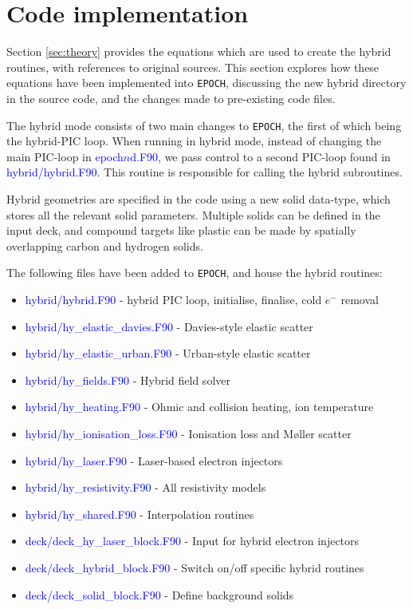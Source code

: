 \documentclass[12pt]{article}
\numberwithin{equation}{section}
\begin{document}
\pagebreak

\section{Code implementation} \label{sec:code}

Section \ref{sec:theory} provides the equations which are used to create the hybrid routines, with references to original sources. This section explores how these equations have been implemented into \texttt{EPOCH}, discussing the new hybrid directory in the source code, and the changes made to pre-existing code files.

The hybrid mode consists of two main changes to \texttt{EPOCH}, the first of which being the hybrid-PIC loop. When running in hybrid mode, instead of changing the main PIC-loop in \textcolor{blue}{epoch$n$d.F90}, we pass control to a second PIC-loop found in \textcolor{blue}{hybrid/hybrid.F90}. This routine is responsible for calling the hybrid subroutines.

Hybrid geometries are specified in the code using a new solid data-type, which stores all the relevant solid parameters. Multiple solids can be defined in the input deck, and compound targets like plastic can be made by spatially overlapping carbon and hydrogen solids.

The following files have been added to \texttt{EPOCH}, and house the hybrid routines:

\begin{itemize}
\item\large{\textcolor{blue}{hybrid/hybrid.F90}} - hybrid PIC loop, initialise, finalise, cold $e^-$ removal
\item\large{\textcolor{blue}{hybrid/hy\_elastic\_davies.F90}} - Davies-style elastic scatter
\item\large{\textcolor{blue}{hybrid/hy\_elastic\_urban.F90}} - Urban-style elastic scatter
\item\large{\textcolor{blue}{hybrid/hy\_fields.F90}} - Hybrid field solver
\item\large{\textcolor{blue}{hybrid/hy\_heating.F90}} - Ohmic and collision heating, ion temperature
\item\large{\textcolor{blue}{hybrid/hy\_ionisation\_loss.F90}} - Ionisation loss and M\o{}ller scatter
\item\large{\textcolor{blue}{hybrid/hy\_laser.F90}} - Laser-based electron injectors
\item\large{\textcolor{blue}{hybrid/hy\_resistivity.F90}} - All resistivity models
\item\large{\textcolor{blue}{hybrid/hy\_shared.F90}} - Interpolation routines
\item\large{\textcolor{blue}{deck/deck\_hy\_laser\_block.F90}} - Input for hybrid electron injectors
\item\large{\textcolor{blue}{deck/deck\_hybrid\_block.F90}} - Switch on/off specific hybrid routines
\item\large{\textcolor{blue}{deck/deck\_solid\_block.F90}} - Define background solids
\end{itemize}
\end{document}
